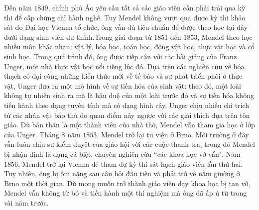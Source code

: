 \begin{multicols}{2}
	Đến năm $1849$, chính phủ Áo yêu cầu tất cả các giáo viên cần phải trải qua kỳ thi để cấp chứng chỉ hành nghề. Tuy Mendel không vượt qua được kỳ thi khảo sát do Đại học Vienna tổ chức, ông vẫn đủ tiêu chuẩn để được theo học tại đây dưới dạng sinh viên dự thính.Trong giai đoạn từ $1851$ đến $1853$, Mendel theo học nhiều môn khác nhau: vật lý, hóa học, toán học, động vật học, thực vật học và cổ sinh học. Trong quá trình đó, ông được tiếp cận với các bài giảng của Franz Unger, một nhà thực vật học nổi tiếng lúc đó. Dựa trên các nghiên cứu về hóa thạch cổ đại cùng những kiến thức mới về tế bào và sự phát triển phôi ở thực vật, Unger đưa ra một mô hình về sự tiến hóa của sinh vật: theo đó, một loài không tự nhiên sinh ra mà là hậu duệ của một loài trước đó và sự tiến hóa không tiến hành theo dạng tuyến tính mà có dạng hình cây. Unger chịu nhiều chỉ trích từ các nhân vật bảo thủ do quan điểm này ngược với các giải thích dựa trên tôn giáo. Dù bản thân là một thành viên của nhà thờ, Mendel vẫn tham gia học ở lớp của Unger.
	\vskip 0.1cm
	Tháng $8$ năm $1853$, Mendel trở lại tu viện ở Brno. Môi trường ở đây vẫn luôn chịu sự kiểm duyệt của giáo hội với các cuộc thanh tra, trong đó Mendel bị nhận định là dạng cá biệt, chuyên nghiên cứu ``các khoa học vớ vẩn". Năm $1856$, Mendel trở lại Vienna để tham dự kỳ thi sát hạch giáo viên lần thứ hai. Tuy nhiên, ông bị ốm nặng sau câu hỏi đầu tiên và phải trở về nằm giường ở Brno một thời gian. Dù mong muốn trở thành giáo viên dạy khoa học bị tan vỡ, Mendel vẫn không từ bỏ và tiến hành một thí nghiệm mà ông đã ấp ủ từ trong vài năm trước.
	\begin{figure}[H]
		\centering
		\vspace*{-5pt}
		\captionsetup{labelformat= empty, justification=centering}

\end{figure}
\end{multicols}

